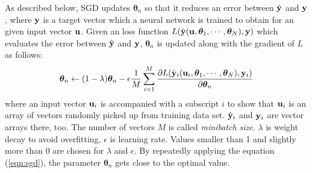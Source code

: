 \documentclass[twocolumn]{article}
\begin{document}
As described below,
SGD updates ${\bm \theta}_n$ so that it reduces an error
between $\hat{\bf y}$ and ${\bf y}$,
where ${\bf y}$ is a target vector
which a neural network is trained to obtain
for an given input vector ${\bf u}$.
Given an loss function
$L(\hat{\bf y}({\bf u},{\bm \theta}_1,\cdots,{\bm \theta}_N),{\bf y})$
which evaluates the error between $\hat{\bf y}$ and ${\bf y}$,
${\bm \theta}_n$ is updated along with the gradient of $L$ as follows:
\begin{eqnarray}
{\bm \theta}_n \leftarrow
(1-\lambda){\bm \theta}_n
- \epsilon
  \frac{1}{M}\sum_{i=1}^M
  \frac{\partial L(\hat{\bf y}_i({\bf u}_i,{\bm \theta}_1,
                               \cdots,{\bm \theta}_N),
                   {\bf y}_i)}
       {\partial {\bm \theta}_n}\label{eqn:sgd}
\end{eqnarray}
where an input vector ${\bf u}_i$ is accompanied with a subscript $i$
to show that ${\bf u}_i$ is an array of vectors randomly picked up
from training data set.
$\hat{\bf y}_i$ and ${\bf y}_i$ are vector arrays there, too.
The number of vectors $M$ is called {\it minibatch size}.
$\lambda$ is weight decay to avoid overfitting,
$\epsilon$ is learning rate.
Values smaller than 1 and slightly more than 0 are chosen
for $\lambda$ and $\epsilon$.
By repeatedly applying the equation (\ref{eqn:sgd}),
the parameter ${\bm \theta}_n$ gets close to the optimal value.
\end{document}
